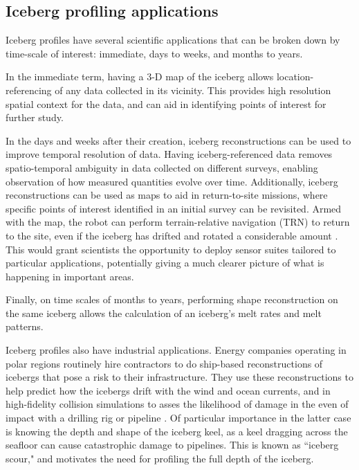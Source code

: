\subsection{Iceberg profiling applications}

Iceberg profiles have several scientific applications that can be broken down by time-scale of interest: immediate, days to weeks, and months to years. 

In the immediate term, having a 3-D map of the iceberg allows location-referencing of any data collected in its vicinity. This provides high resolution spatial context for the data, and can aid in identifying points of interest for further study. 

In the days and weeks after their creation, iceberg reconstructions can be used to improve temporal resolution of data. Having iceberg-referenced data removes spatio-temporal ambiguity in data collected on different surveys, enabling observation of how measured quantities evolve over time. Additionally, iceberg reconstructions can be used as maps to aid in return-to-site missions, where specific points of interest identified in an initial survey can be revisited. Armed with the map, the robot can perform terrain-relative navigation (TRN) to return to the site, even if the iceberg has drifted and rotated a considerable amount \cite{Kimball2011b}. This would grant scientists the opportunity to deploy sensor suites tailored to particular applications, potentially giving a much clearer picture of what is happening in important areas.

Finally, on time scales of months to years, performing shape reconstruction on the same iceberg allows the calculation of an iceberg's melt rates and melt patterns.

Iceberg profiles also have industrial applications. Energy companies operating in polar regions routinely hire contractors to do ship-based reconstructions of icebergs that pose a risk to their infrastructure. They use these reconstructions to help predict how the icebergs drift with the wind and ocean currents, and in high-fidelity collision simulations to asses the likelihood of damage in the even of impact with a drilling rig or pipeline \cite{ralph2008iceberg} \cite{fuglem1996iceberg}. Of particular importance in the latter case is knowing the depth and shape of the iceberg keel, as a keel dragging across the seafloor can cause catastrophic damage to pipelines. This is known as ``iceberg scour," and motivates the need for profiling the full depth of the iceberg.

